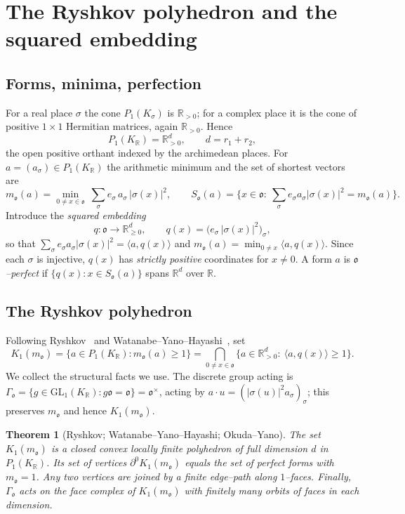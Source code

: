 \documentclass[11pt,reqno]{amsart}
\theoremstyle{plain}
\newtheorem{theorem}{Theorem}[section]
\theoremstyle{definition}
\newcommand{\R}{\mathbb{R}}
\newcommand{\Ok}{\mathfrak{o}}
\newcommand{\GL}{\mathrm{GL}}
\newcommand{\bdy}{\partial}
\begin{document}
\section{The Ryshkov polyhedron and the squared embedding}\label{sec:framework}

\subsection{Forms, minima, perfection}
For a real place $\sigma$ the cone $P_1(K_\sigma)$ is $\R_{>0}$; for a complex place it is the cone of
positive $1\times1$ Hermitian matrices, again $\R_{>0}$. Hence
\[
P_1(K_\R)=\R^d_{>0},\qquad d=r_1+r_2 ,
\]
the open positive orthant indexed by the archimedean places. For $a=(a_\sigma)\in P_1(K_\R)$ the arithmetic
minimum and the set of shortest vectors are
\[
m_\Ok(a)=\min_{0\ne x\in\Ok}\ \sum_{\sigma}e_\sigma\,a_\sigma\,|\sigma(x)|^2 ,
\qquad
S_\Ok(a)=\Big\{x\in\Ok:\ \textstyle\sum_\sigma e_\sigma a_\sigma|\sigma(x)|^2=m_\Ok(a)\Big\}.
\]
Introduce the \emph{squared embedding}
\begin{equation}\label{eq:q}
q:\Ok\longrightarrow \R^d_{\ge0},\qquad q(x)=\big(e_\sigma\,|\sigma(x)|^2\big)_\sigma ,
\end{equation}
so that $\sum_\sigma e_\sigma a_\sigma|\sigma(x)|^2=\langle a,q(x)\rangle$ and
$m_\Ok(a)=\min_{0\ne x}\langle a,q(x)\rangle$. Since each $\sigma$ is injective, $q(x)$ has \emph{strictly
positive} coordinates for $x\ne0$. A form $a$ is \emph{$\Ok$--perfect} if
$\{q(x):x\in S_\Ok(a)\}$ spans $\R^d$ over $\R$.

\subsection{The Ryshkov polyhedron}
Following Ryshkov~\cite{Ryshkov} and Watanabe--Yano--Hayashi~\cite{WYH},
set
\[
K_1(m_\Ok)=\{a\in P_1(K_\R): m_\Ok(a)\ge1\}
=\bigcap_{0\ne x\in\Ok}\{a\in\R^d_{>0}:\ \langle a,q(x)\rangle\ge1\}.
\]
We collect the structural facts we use. The discrete group acting is
$\Gamma_\Ok=\{g\in\GL_1(K_\R):g\Ok=\Ok\}=\Ok^\times$, acting by $a\cdot u=(|\sigma(u)|^2a_\sigma)_\sigma$;
this preserves $m_\Ok$ and hence $K_1(m_\Ok)$.

\begin{theorem}[Ryshkov; Watanabe--Yano--Hayashi; Okuda--Yano]\label{thm:wyh}
The set $K_1(m_\Ok)$ is a closed convex \emph{locally finite} polyhedron of full dimension $d$ in
$P_1(K_\R)$. Its set of vertices $\bdy^0K_1(m_\Ok)$ equals the set of perfect forms with $m_\Ok=1$. Any two
vertices are joined by a finite edge--path along $1$--faces. Finally, $\Gamma_\Ok$ acts on the face complex
of $K_1(m_\Ok)$ with finitely many orbits of faces in each dimension.
\end{theorem}
\end{document}
